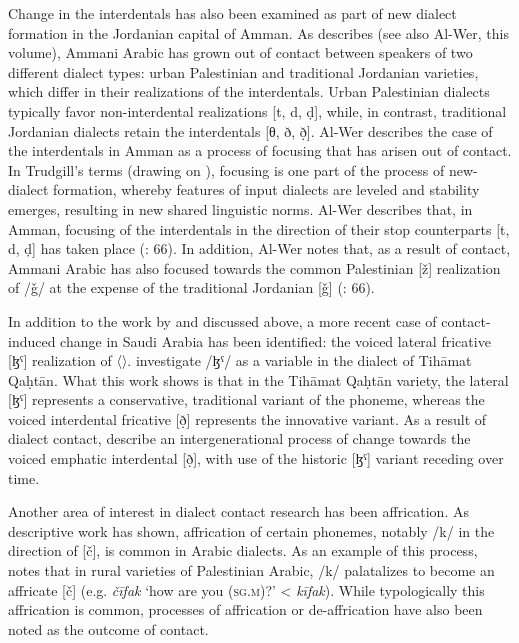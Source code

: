 \documentclass[output=paper]{langsci/langscibook}
\begin{document}
  Change in the interdentals has also been examined as part of new dialect formation in the Jordanian capital of Amman. As \citet{Al-Wer2007} describes (see also Al-Wer, this volume), Ammani Arabic has grown out of contact between speakers of two different dialect types: urban Palestinian and traditional Jordanian varieties, which differ in their realizations of the interdentals. Urban Palestinian dialects typically favor non-interdental realizations [t, d, ḍ], while, in contrast, traditional Jordanian dialects retain the interdentals [θ, ð, ð̣]. Al-Wer describes the case of the interdentals in Amman as a process of focusing \citep{Trudgill2004} that has arisen out of contact. In Trudgill’s terms (drawing on \citealt{LePageTabouret-Keller1985}), focusing is one part of the process of new-dialect formation, whereby features of input dialects are leveled and stability emerges, resulting in new shared linguistic norms. Al-Wer describes that, in Amman, focusing of the interdentals in the direction of their stop counterparts [t, d, ḍ] has taken place (\citealt{Al-Wer2007}: 66). In addition, Al-Wer notes that, as a result of contact, Ammani Arabic has also focused towards the common Palestinian [ž] realization of /ǧ/ at the expense of the traditional Jordanian [ǧ] (\citealt{Al-Wer2007}: 66).  

  In addition to the work by \citet{Al-Essa2008} and \citet{Alghamdi2014} discussed above, a more recent case of contact-induced change in Saudi Arabia has been identified: the voiced lateral fricative [ɮˤ] realization of 〈〉. \citet{Al-WerAl-Qahtani2016} investigate /ɮˤ/ as a variable in the dialect of Tihāmat Qaḥtān. What this work shows is that in the Tihāmat Qaḥtān variety, the lateral [ɮˤ] represents a conservative, traditional variant of the phoneme, whereas the voiced interdental fricative [ð̣] represents the innovative variant. As a result of dialect contact, \citet{Al-WerAl-Qahtani2016} describe an intergenerational process of change towards the voiced emphatic interdental [ð̣], with use of the historic [ɮˤ] variant receding over time.

  Another area of interest in dialect contact research has been affrication. As descriptive work has shown, affrication of certain phonemes, notably /k/ in the direction of [č], is common in Arabic dialects. As an example of this process, \citet{Shahin2011} notes that in rural varieties of Palestinian Arabic, /k/ palatalizes to become an affricate [č] (e.g. \textit{čīfak} ‘how are you (\textsc{sg.m})?’ < \textit{kīfak}). While typologically this affrication is common, processes of affrication or de-affrication have also been noted as the outcome of contact. 
\end{document}
